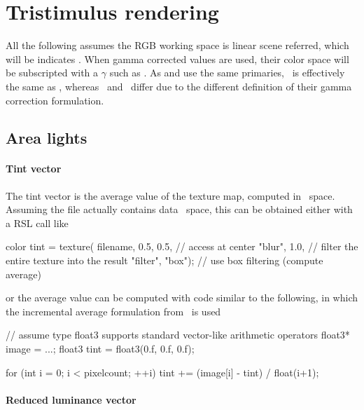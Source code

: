 \section{Tristimulus rendering}

All the following assumes the \gls{RGB} working space is 
linear scene referred, which will be indicates \sRGBl. When gamma corrected
values are used, their color space will be subscripted with a $\gamma$ such as
\sRGBg. As  and  use the same primaries,
\sRGBl\ is effectively the same as \RecSONl, whereas \sRGBg\ and \RecSONg\
differ due to the different definition of their gamma correction formulation.


\subsection{Area lights}

\paragraph{Tint vector}

The tint vector is the average value of the texture map, computed in \sRGBl\
space. Assuming the file actually contains data \sRGBl\ space, this can be
obtained either with a \gls{RSL} call like

\begin{rslcode}
color tint = texture(
                filename,
                0.5, 0.5,         // access at center
                "blur", 1.0,      // filter the entire texture into the result
                "filter", "box"); // use box filtering (compute average)
\end{rslcode}
or the average value can be computed with code similar to the following, in
which the incremental average formulation from~\cite{knuth97} is used

\begin{c++code}
// assume type float3 supports standard vector-like arithmetic operators
float3* image = ...;
float3 tint = float3(0.f, 0.f, 0.f);

for (int i = 0; i < pixelcount; ++i)
{
    tint += (image[i] - tint) / float(i+1);
}
\end{c++code}

\paragraph{Reduced luminance vector}

